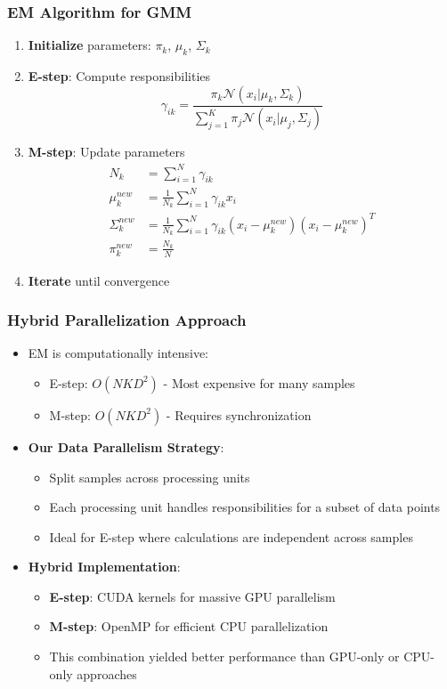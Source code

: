 \documentclass{beamer}
\begin{document}
\begin{frame}
    \frametitle{EM Algorithm for GMM}
    \begin{enumerate}
        \item \textbf{Initialize} parameters: $\pi_k$, $\mu_k$, $\Sigma_k$
        \item \textbf{E-step}: Compute responsibilities
        \begin{equation}
            \gamma_{ik} = \frac{\pi_k \mathcal{N}(x_i|\mu_k,\Sigma_k)}{\sum_{j=1}^{K} \pi_j \mathcal{N}(x_i|\mu_j,\Sigma_j)}
        \end{equation}
        \item \textbf{M-step}: Update parameters
        \begin{align}
            N_k &= \sum_{i=1}^{N} \gamma_{ik} \\
            \mu_k^{new} &= \frac{1}{N_k}\sum_{i=1}^{N} \gamma_{ik}x_i \\
            \Sigma_k^{new} &= \frac{1}{N_k}\sum_{i=1}^{N} \gamma_{ik}(x_i-\mu_k^{new})(x_i-\mu_k^{new})^T \\
            \pi_k^{new} &= \frac{N_k}{N}
        \end{align}
        \item \textbf{Iterate} until convergence
    \end{enumerate}
\end{frame}

\begin{frame}
    \frametitle{Hybrid Parallelization Approach}
    \begin{itemize}
        \item EM is computationally intensive:
        \begin{itemize}
            \item E-step: $O(NKD^2)$ - Most expensive for many samples
            \item M-step: $O(NKD^2)$ - Requires synchronization
        \end{itemize}
        \item \textbf{Our Data Parallelism Strategy}:
        \begin{itemize}
            \item Split samples across processing units
            \item Each processing unit handles responsibilities for a subset of data points
            \item Ideal for E-step where calculations are independent across samples
        \end{itemize}
        \item \textbf{Hybrid Implementation}:
        \begin{itemize}
            \item \textbf{E-step}: CUDA kernels for massive GPU parallelism
            \item \textbf{M-step}: OpenMP for efficient CPU parallelization
            \item This combination yielded better performance than GPU-only or CPU-only approaches
        \end{itemize}
    \end{itemize}
\end{frame}
\end{document}
